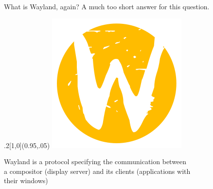 \documentclass[ucs,9pt]{beamer}
\begin{document}
\begin{frame}
    {What is Wayland, again?}
    {A much too short answer for this question.}

    \begin{textblock*}{.2\paperwidth}[1,0](0.95\paperwidth,.05\paperheight)%
        \includegraphics[width=\linewidth]{wayland.png}
    \end{textblock*}%

    Wayland is a protocol specifying the communication between\\
    a compositor (display server) and its clients (applications with\\
    their windows)


\end{frame}
\end{document}
